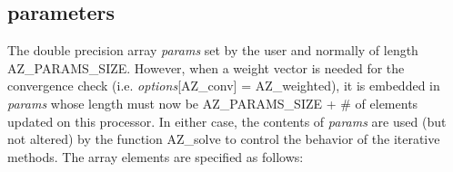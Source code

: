 \subsection{\Az{} parameters\label{optionD}}

The double precision array {\it params\/} set by the user and normally of
length {\sf AZ\_PARAMS\_SIZE}. However, when a weight vector is needed for the
convergence check (i.e. {\it options}[{\sf AZ\_conv}] = {\sf AZ\_weighted}), it
is embedded in {\it params\/} whose length must now be {\sf AZ\_PARAMS\_SIZE} +
\# of elements updated on this processor.  In either case, the contents of {\it
  params\/} are used (but not altered) by the function {\sf AZ\_solve} to
control the behavior of the iterative methods.  The array elements are
specified as follows: \vspace{2em}
{ \hrulefill} \nopagebreak \\[0.5em]
%

